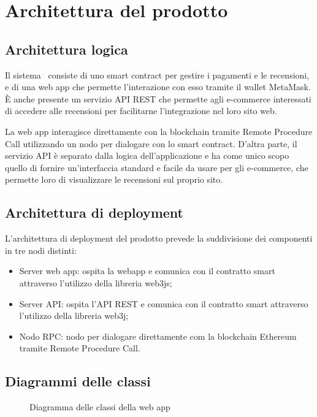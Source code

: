 \section{Architettura del prodotto}

\subsection{Architettura logica}
Il sistema \capName\ consiste di uno smart contract per gestire i pagamenti e le recensioni, e di una web app che permette l'interazione con esso tramite il wallet MetaMask. È anche presente un servizio API REST che permette agli e-commerce interessati di accedere alle recensioni per facilitarne l'integrazione nel loro sito web.

La web app interagisce direttamente con la blockchain tramite Remote Procedure Call utilizzando un nodo per dialogare con lo smart contract. D'altra parte, il servizio API è separato dalla logica dell'applicazione e ha come unico scopo quello di fornire un'interfaccia standard e facile da usare per gli e-commerce, che permette loro di visualizzare le recensioni sul proprio sito.

\subsection{Architettura di deployment}
L'architettura di deployment del prodotto prevede la suddivisione dei componenti in tre nodi distinti:
\begin{itemize}
    \item Server web app: ospita la webapp e comunica con il contratto smart attraverso l'utilizzo della libreria web3js;
    \item Server API: ospita l'API REST e comunica con il contratto smart attraverso l'utilizzo della libreria web3j;
    \item Nodo RPC: nodo per dialogare direttamente com la blockchain Ethereum tramite Remote Procedure Call.
\end{itemize}

\subsection{Diagrammi delle classi}
\begin{figure}[H]
    
    \caption{Diagramma delle classi della web app}\label{fig:webapp}
\end{figure}


